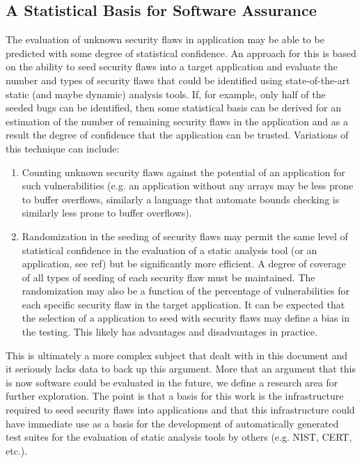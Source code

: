 \subsection{A Statistical Basis for Software Assurance}
\label{sec:NewResearchArea}
    The evaluation of unknown security flaws in application may be able to
be predicted with some degree of statistical confidence.  An approach for this
is based on the ability to seed security flaws into a target application and 
evaluate the number and types of security flaws that could be identified
using state-of-the-art static (and maybe dynamic) analysis tools.  If, for example,
only half of the seeded bugs can be identified, then some statistical basis
can be derived for an estimation of the number of remaining security flaws in 
the application and as a result the degree of confidence that the application 
can be trusted.  Variations of this technique can include:
\begin{enumerate}
   \item Counting unknown security flaws against the potential of an application for such
         vulnerabilities (e.g. an application without any arrays may be less prone to
         buffer overflows, similarly a language that automate bounds checking is similarly
         less prone to buffer overflows). 

   \item Randomization in the seeding of security flaws may permit the same level of
         statistical confidence in the evaluation of a static analysis tool (or an
         application, see ref{}) but be significantly more efficient.  A degree of
         coverage of all types of seeding of each security flaw must be maintained.
         The randomization may also be a function of the percentage of vulnerabilities 
         for each specific security flaw in the target application.  It can be expected
         that the selection of a application to seed with security flaws may define a 
         bias in the testing.  This likely has advantages and disadvantages in practice.
 
\end{enumerate}

This is ultimately a more complex subject that dealt with in this
document and it seriously lacks data to back up this argument.  More that an argument
that this is now software could be evaluated in the future, we define a research
area for further exploration.  The point is that a basis for this work is the
infrastructure required to seed security flaws into applications and that 
this infrastructure could have immediate use as a basis for the development of
automatically generated test suites for the evaluation of static analysis tools
by others (e.g. NIST, CERT, etc.).


